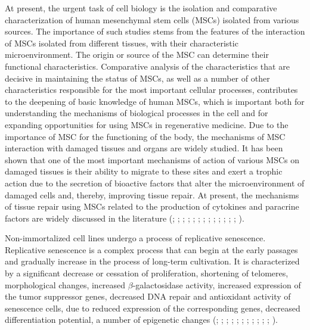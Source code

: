 \documentclass[english,authoryear]{elsarticle}
\begin{document}
At present, the urgent task of cell biology is the isolation and comparative characterization of human mesenchymal stem cells (MSCs) isolated from various sources.
The importance of such studies stems from the features of the interaction of MSCs isolated from different tissues, with their characteristic microenvironment.
The origin or source of the MSC can determine their functional characteristics.
Comparative analysis of the characteristics that are decisive in maintaining the status of MSCs, as well as a number of other characteristics responsible for the most important cellular processes, contributes to the deepening of basic knowledge of human MSCs, which is important both for understanding the mechanisms of biological processes in the cell and for expanding opportunities for using MSCs in regenerative medicine.
Due to the importance of MSC for the functioning of the body, the mechanisms of MSC interaction with damaged tissues and organs are widely studied.
It has been shown that one of the most important mechanisms of action of various MSCs on damaged tissues is their ability to migrate to these sites and exert a trophic action due to the secretion of bioactive factors that alter the microenvironment of damaged cells and, thereby, improving tissue repair.
At present, the mechanisms of tissue repair using MSCs related to the production of cytokines and paracrine factors are widely discussed in the literature (\cite{phinney2007concise}; \cite{m2011mesenchymal}; \cite{guiducci2011bone}; \cite{gruenloh2011characterization}; \cite{huang2013effects}; \cite{luo2013mesenchymal}; \cite{ando2014stem}; \cite{hendijani2015human}; \cite{hendijani2015effect}; \cite{danieli2016testing}; \cite{julianto2016topical}; \cite{teixeira2017impact}; \cite{vulcano2016wharton}; \cite{zachar2016activation}).


Non-immortalized cell lines undergo a process of replicative senescence.
Replicative senescence is a complex process that can begin at the early passages and gradually increase in the process of long-term cultivation.
It is characterized by a significant decrease or cessation of proliferation, shortening of telomeres, morphological changes, increased $\beta$-galactosidase activity, increased expression of the tumor suppressor genes, decreased DNA repair and antioxidant activity of senescence cells, due to reduced expression of the corresponding genes, decreased differentiation potential, a number of epigenetic changes (\cite{wagner2008replicative}; \cite{kuilman2010essence}; \cite{redaelli2012cytogenomic}; \cite{estrada2013human}; \cite{savickiene2016senescence}; \cite{danisovic2017effect}; \cite{koltsova2018dynamics}; \cite{alessio2018mesenchymal}; \cite{krylova2018isolation}; \cite{niedernhofer2018nuclear}; \cite{truong2018characterization}; \cite{yu2018replicative}).
\end{document}
